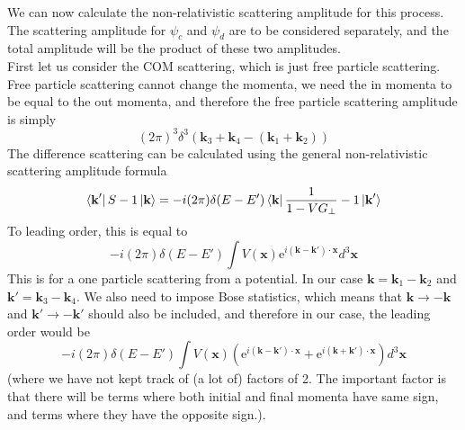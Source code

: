 \documentclass[11pt]{article}
\newcommand{\e}{\mathrm{e}}
\numberwithin{equation}{section}
\begin{document}
    We can now calculate the non-relativistic scattering amplitude for this process. The scattering amplitude for \(\psi_c\) and \(\psi_d\) are to be considered separately, and the total amplitude will be the product of these two amplitudes. \\
    First let us consider the COM scattering, which is just free particle scattering. Free particle scattering cannot change the momenta, we need the in momenta to be equal to the out momenta, and therefore the free particle scattering amplitude is simply 
    \begin{equation*}
        (2\pi)^3\delta^3(\textbf{k}_3 +  \textbf{k}_4 - (\textbf{k}_1 + \textbf{k}_2))
    \end{equation*}
    The difference scattering can be calculated using the general non-relativistic scattering amplitude formula 
    \begin{equation*}
        \bra{\textbf{k}'}S-1\ket{\textbf{k}} = -i(2\pi)\delta(E - E') \bra{\textbf{k}} \frac{1}{1 - VG_\perp} -1 \ket{\textbf{k}'}
    \end{equation*}
    To leading order, this is equal to 
    \begin{equation*}
        -i(2\pi)\delta(E - E') \int V(\textbf{x}) \e^{i(\textbf{k} - \textbf{k}')\cdot \textbf{x}}d^3\textbf{x}
    \end{equation*}
    This is for a one particle scattering from a potential. In our case \(\textbf{k} = \textbf{k}_1 - \textbf{k}_2\) and \(\textbf{k}' = \textbf{k}_3 - \textbf{k}_4\). We also need to impose Bose statistics, which means that \(\textbf{k}\to -\textbf{k}\) and \(\textbf{k}' \to -\textbf{k}'\) should also be included, and therefore in our case, the leading order would be 
    \begin{equation*}
        -i(2\pi)\delta(E - E') \int V(\textbf{x}) \left( \e^{i(\textbf{k} - \textbf{k}') \cdot \textbf{x}} + \e^{i(\textbf{k} + \textbf{k}') \cdot \textbf{x}}\right)d^3\textbf{x}
    \end{equation*}
    (where we have not kept track of (a lot of) factors of 2. The important factor is that there will be terms where both initial and final momenta have same sign, and terms where they have the opposite sign.). \\
    
\end{document}

